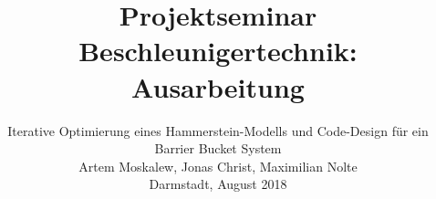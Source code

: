 \documentclass[scrreprt,colorback,accentcolor=tud9b, 11pt]{tudreport}
\begin{document}
	\renewcommand{\importTikz}[1]{}			%

    \title{Projektseminar Beschleunigertechnik: Ausarbeitung}
    \subtitle{Iterative Optimierung eines Hammerstein-Modells und Code-Design für ein Barrier Bucket System
    		\\
    		Artem Moskalew, Jonas Christ,	Maximilian Nolte
    		\\
    		Darmstadt, August 2018}
    \maketitle

    \tableofcontents
    
    
%	
	
	
	
	
	
	
	
	
	
	



\end{document}
